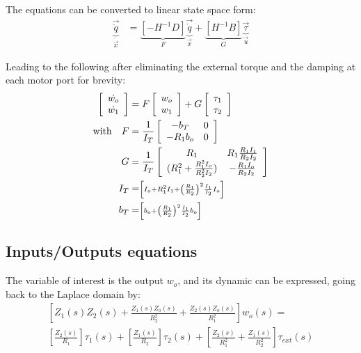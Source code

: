 The equations can be converted to linear state space form:
\begin{align}
\underbrace{ \vec{\ddot{q}} }_{\dot{\vec{x}}}
 &= 
\underbrace{ \left[ -H^{-1} D \right] }_{F}
\underbrace{ \vec{\dot{q}} }_{\vec{x}}
+ 
\underbrace{ \left[ H^{-1} B \right] }_{G}
\underbrace{ \vec{\tau} }_{\vec{u}}
\end{align}

Leading to the following after eliminating the external torque and the damping at each motor port for brevity:
\begin{align}
\left[
\begin{array}{c}
\dot{w_o}\\
\dot{w_1}
\end{array}
\right] &= 
F
\left[ \begin{array}{c}
w_o \\
w_1
\end{array} \right]+
G
\left[ \begin{array}{c}
\tau_1 \\
\tau_2
\end{array} \right] 
\label{eq:ss}
\\
\text{with} \quad 
F &=
\frac{1}{I_T}
\left[
\begin{array}{c c}
-b_T      &  0 \\
-R_1 b_o  &  0 \\
\end{array}
\right] \\
G &= 
\frac{1}{I_T}
\left[
\begin{array}{c c}
 R_1  &   R_1 \frac{R_1 I_1}{R_2 I_2}  \\
(R_1^2+\frac{R_1^2 I_o}{R_2^2 I_2})  &  - \frac{R_1 I_o}{R_2 I_2} \\
\end{array}
\right] \\
 I_T &=  \scriptstyle \left[   I_o + R_1^2 I_1 + \left( \frac{R_1}{R_2} \right)^2 \frac{I_1}{I_2} I_o \right]\\
 b_T &= \scriptstyle \left[ b_o + \left( \frac{R_1}{R_2} \right)^2 \frac{I_1}{I_2} b_o \right] 
\end{align}
%


\subsection{Inputs/Outputs equations}
\label{sec:out}

The variable of interest is the output $w_o$, and its dynamic can be expressed, going back to the Laplace domain by:
%
\begin{align}
\left[
 Z_1(s) Z_2(s) + \frac{Z_1(s) Z_o(s)}{R_2^2} + \frac{Z_2(s) Z_o(s)}{R_1^2}
\right] w_o(s) = \\
\left[
 \frac{Z_2(s)}{R_1}
\right] \tau_1(s)  + 
\left[
 \frac{Z_1(s)}{R_2}
\right] \tau_2(s)  + 
\left[
 \frac{Z_2(s)}{R_1^2} + \frac{Z_1(s) }{R_2^2}
\right] \tau_{ext}(s)
\label{eq:dsdm_output}
\end{align}

